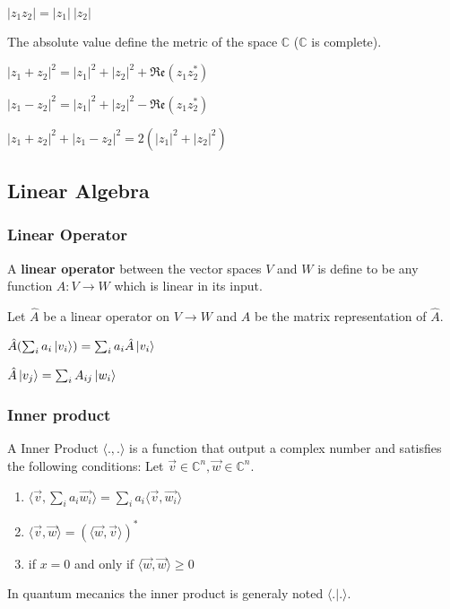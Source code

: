 \documentclass[5pt]{article}
\begin{document}
\begin{multicols}{3}
\begin{properties}
     \begin{itemize*}
          \item $|z_1z_2|=|z_1|\:|z_2|$
          \item The absolute value define the metric of the space $\mathbb{C}$ ($\mathbb{C}$ is complete).
          \item $|z_1+z_2|^2=|z_1|^2+|z_2|^2+\mathfrak{Re}(z_1z_2^*)$
          \item $|z_1-z_2|^2=|z_1|^2+|z_2|^2-\mathfrak{Re}(z_1z_2^*)$
          \item $|z_1+z_2|^2+|z_1-z_2|^2=2(|z_1|^2+|z_2|^2)$
     \end{itemize*}
\end{properties}



\subsection{Linear Algebra}

\subsubsection{Linear Operator}
A \textbf{linear operator} between the vector spaces $V$ and $W$ is define to be any function $A:V\rightarrow W$ which is linear in its input.
\begin{properties}
     Let $\hat{A}$ be a linear operator on $V\rightarrow W$  and $A$ be the matrix representation of $\hat{A}$.
     \begin{itemize*}
          \item $\hat{A}(\sum_ia_i\ket{v_i})=\sum_ia_i\hat{A}\ket{v_i}$\\
          \item $\hat{A}\ket{v_j}=\sum_iA_{ij}\ket{w_i}$\\
     \end{itemize*}
\end{properties}


\subsubsection{Inner product}
A Inner Product $\langle.,.\rangle$ is a function that output a complex number and satisfies the following conditions: Let $\vec{v}\in\mathbb{C}^n, \vec{w}\in\mathbb{C}^n$.
\begin{enumerate}
     \item $\langle \vec{v},\sum_ia_i\vec{w_i}\rangle=\sum_ia_i\langle \vec{v},\vec{w_i}\rangle$
     \item $\langle \vec{v},\vec{w}\rangle=(\langle \vec{w},\vec{v}\rangle)^*$
     \item if $x=0$ and only if $\langle \vec{w},\vec{w}\rangle\geq 0$
\end{enumerate}
In quantum mecanics the inner product is generaly noted $\langle.|.\rangle$.



\end{multicols}
\end{document}
